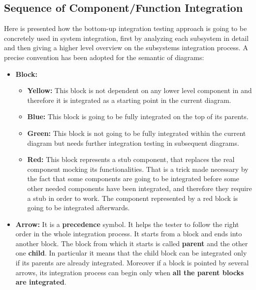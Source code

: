 \subsection{Sequence of Component/Function Integration}
Here is presented how the bottom-up integration testing approach is going to be concretely used in \myTaxiService{} system integration, first by analyzing each subsystem in detail and then giving a higher level overview on the subsystems integration process.
A precise convention has been adopted for the semantic of diagrams:
\begin{itemize}
	\item
		\textbf{Block:}
		\begin{itemize}
			\item \textbf{Yellow:} This block is not dependent on any lower level component in \myTaxiService{} and therefore it is integrated as a starting point in the current diagram.
			\item \textbf{Blue:} This block is going to be fully integrated on the top of its parents.
			\item \textbf{Green:} This block is not going to be fully integrated within the current diagram but needs further integration testing in subsequent diagrams.
			\item \textbf{Red:} This block represents a stub component, that replaces the real component mocking its functionalities.
			That is a trick made necessary by the fact that some components are going to be integrated before some other needed components have been integrated, and therefore they require a stub in order to work.
			The component represented by a red block is going to be integrated afterwards.
		\end{itemize}
	\item
		\textbf{Arrow:} It is a \textbf{precedence} symbol. It helps the tester to follow the right order in the whole integration process. It starts from a block and ends into another block. The block from which it starts is called \textbf{parent} and the other one \textbf{child}. In particular it means that the child block can be integrated only if its parents are already integrated. Moreover if a block is pointed by several arrows, its integration process can begin only when \textbf{all the parent blocks are integrated}.
\end{itemize}

